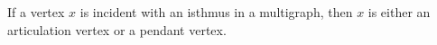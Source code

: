 If a vertex $x$ is incident with an isthmus in a multigraph, then $x$ is either an articulation vertex or a pendant vertex.
